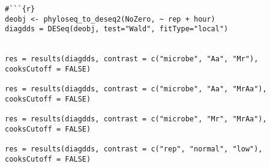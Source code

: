 \documentclass[]{article}
\begin{document}
\subsection{}\label{section-24}

\subsubsection{}\label{section-25}

\begin{verbatim}

#```{r}
deobj <- phyloseq_to_deseq2(NoZero, ~ rep + hour)
diagdds = DESeq(deobj, test="Wald", fitType="local")


res = results(diagdds, contrast = c("microbe", "Aa", "Mr"), cooksCutoff = FALSE)

res = results(diagdds, contrast = c("microbe", "Aa", "MrAa"), cooksCutoff = FALSE)

res = results(diagdds, contrast = c("microbe", "Mr", "MrAa"), cooksCutoff = FALSE)

res = results(diagdds, contrast = c("rep", "normal", "low"), cooksCutoff = FALSE)


\end{verbatim}
\end{document}
